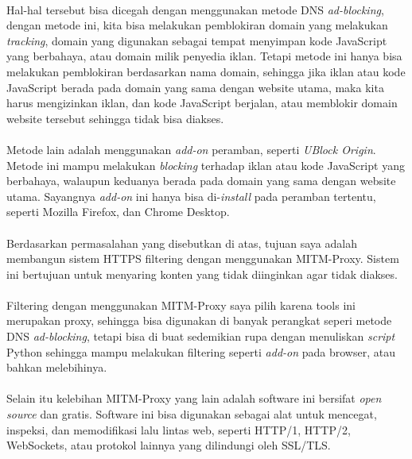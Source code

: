 \documentclass[../PROPOSAL_PRA_SKRIPSI_ALDZIKRI_DWIJAYANTO_PRATHAMA.tex]{subfiles}
\begin{document}
  \paragraph*{}Hal-hal tersebut bisa dicegah dengan
  menggunakan metode DNS \textit{ad-blocking}, dengan metode
  ini, kita bisa melakukan pemblokiran domain yang melakukan
  \textit{tracking}, domain yang digunakan sebagai
  tempat menyimpan kode JavaScript yang berbahaya, atau
  domain milik penyedia iklan. Tetapi metode
  ini hanya bisa melakukan pemblokiran berdasarkan nama
  domain, sehingga jika iklan atau kode JavaScript berada
  pada domain yang sama dengan website utama, maka kita
  harus mengizinkan iklan, dan kode JavaScript berjalan,
  atau memblokir domain website tersebut sehingga tidak bisa
  diakses.

  \paragraph*{}Metode lain adalah menggunakan
  \textit{add-on} peramban, seperti \textit{UBlock Origin}.
  Metode ini mampu melakukan \textit{blocking} terhadap
  iklan atau kode JavaScript yang berbahaya, walaupun
  keduanya berada pada domain yang sama dengan website
  utama. Sayangnya \textit{add-on} ini hanya bisa
  di-\textit{install} pada peramban tertentu, seperti
  Mozilla Firefox, dan Chrome Desktop.

  \paragraph*{}Berdasarkan permasalahan yang disebutkan
  di atas, tujuan saya adalah membangun sistem HTTPS
  filtering dengan menggunakan MITM-Proxy. Sistem ini
  bertujuan untuk menyaring konten yang tidak diinginkan
  agar tidak diakses.

  \paragraph*{}Filtering dengan menggunakan MITM-Proxy saya
  pilih karena tools ini merupakan proxy, sehingga bisa
  digunakan di banyak perangkat seperi metode DNS
  \textit{ad-blocking}, tetapi bisa di buat sedemikian rupa
  dengan menuliskan \textit{script} Python sehingga mampu
  melakukan filtering seperti \textit{add-on} pada browser,
  atau bahkan melebihinya.

  \paragraph*{}Selain itu kelebihan MITM-Proxy yang lain
  adalah software ini bersifat \textit{open source} dan
  gratis. Software ini bisa digunakan sebagai alat untuk
  mencegat, inspeksi, dan memodifikasi lalu lintas web,
  seperti HTTP/1, HTTP/2, WebSockets, atau protokol lainnya
  yang dilindungi oleh SSL/TLS.
\end{document}
